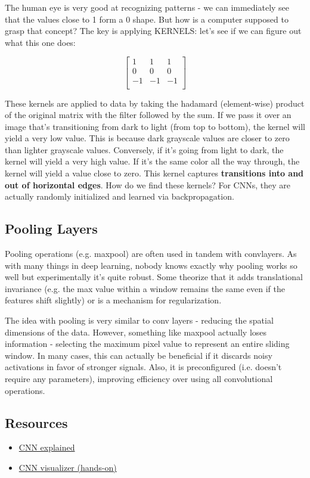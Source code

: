 \documentclass[12pt]{article}
\begin{document}
The human eye is very good at recognizing patterns - we can immediately see that the values close to 1 form a 0 shape. But how is a computer supposed to grasp that concept? The key is applying KERNELS: let's see if we can figure out what this one does:

\[
\begin{bmatrix}
1 & 1 & 1 \\
0 & 0 & 0 \\
-1 & -1 & -1 \\
\end{bmatrix}
\]

These kernels are applied to data by taking the hadamard (element-wise) product of the original matrix with the filter followed by the sum. If we pass it over an image that's transitioning from dark to light (from top to bottom), the kernel will yield a very low value. This is because dark grayscale values are closer to zero than lighter grayscale values. Conversely, if it's going from light to dark, the kernel will yield a very high value. If it's the same color all the way through, the kernel will yield a value close to zero. This kernel captures \textbf{transitions into and out of horizontal edges}. How do we find these kernels? For CNNs, they are actually randomly initialized and learned via backpropagation. 

\subsection{Pooling Layers}

Pooling operations (e.g. maxpool) are often used in tandem with convlayers. As with many things in deep learning, nobody knows exactly why pooling works so well but experimentally it's quite robust. Some theorize that it adds translational invariance (e.g. the max value within a window remains the same even if the features shift slightly) or is a mechanism for regularization.

The idea with pooling is very similar to conv layers - reducing the spatial dimensions of the data. However, something like maxpool actually loses information - selecting the maximum pixel value to represent an entire sliding window. In many cases, this can actually be beneficial if it discards noisy activations in favor of stronger signals. Also, it is preconfigured (i.e. doesn't require any parameters), improving efficiency over using all convolutional operations. 

\subsection{Resources}
\begin{itemize}
  \item \href{https://towardsdatascience.com/convolutional-neural-networks-explained-9cc5188c4939/}{CNN explained}  
  \item \href{https://poloclub.github.io/cnn-explainer/}{CNN visualizer (hands-on)}
\end{itemize}
\end{document}
